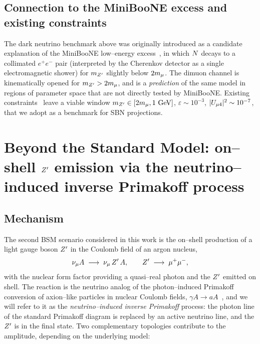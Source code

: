 \subsection{Connection to the MiniBooNE excess and existing constraints}

The dark neutrino benchmark above was originally introduced as a
candidate explanation of the MiniBooNE low--energy
excess~\cite{Bertuzzo:2018itn,Ballett:2018ynz,Ballett:2019pyw,
Abdullahi:2020nyr}, in which $N$ decays to a collimated $e^+e^-$
pair (interpreted by the Cherenkov detector as a single
electromagnetic shower) for $m_{Z^{\prime}}$ slightly below $2m_\mu$.  The dimuon
channel is kinematically opened for $m_{Z^{\prime}} > 2m_\mu$, and is a
\emph{prediction} of the same model in regions of parameter space that
are not directly tested by MiniBooNE.  Existing
constraints~\cite{Bauer:2018onh,Pospelov:2007mp,Andreas:2012mt,
Argyropoulos:2022wjm} leave a viable window
$m_{Z^{\prime}} \in [2m_\mu, 1~\text{GeV}]$, $\varepsilon \sim 10^{-3}$,
$|U_{\mu 4}|^2 \sim 10^{-7}$, that we adopt as a benchmark for SBN
projections.

\section{Beyond the Standard Model: on--shell $Z^{\prime}$ emission via the
neutrino--induced inverse Primakoff process}\label{sec:inv-primakoff}

\subsection{Mechanism}

The second BSM scenario considered in this work is the on--shell
production of a light gauge boson $Z^{\prime}$ in the Coulomb field of an
argon nucleus,
\begin{equation}
  \nu_\mu A \;\longrightarrow\; \nu_\mu\, Z^{\prime}\, A,
  \qquad Z^{\prime} \;\longrightarrow\; \mu^+\mu^-,
  \label{eq:invPrim}
\end{equation}
with the nuclear form factor providing a quasi--real photon and the
$Z^{\prime}$ emitted on shell.  The reaction is the neutrino analog of the
photon--induced Primakoff conversion of axion--like particles in
nuclear Coulomb fields, $\gamma A \to a A$~\cite{Primakoff:1951pj},
and we will refer to it as the \emph{neutrino--induced inverse
Primakoff} process: the photon line of the standard Primakoff
diagram is replaced by an active neutrino line, and the
$Z^{\prime}$ is in the final state.  Two complementary topologies contribute
to the amplitude, depending on the underlying model:

